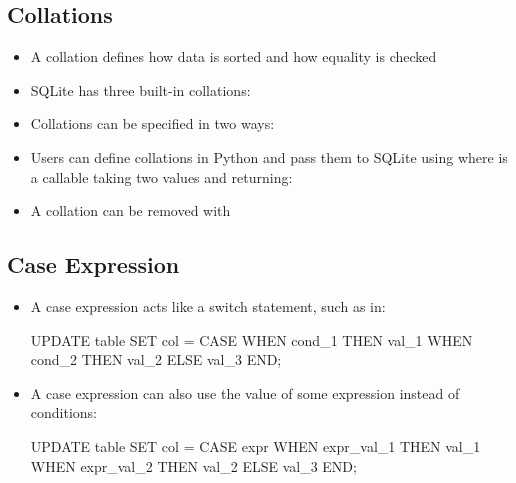 \documentclass[a4paper]{article}
\begin{document}
\subsection{Collations}
\begin{itemize}
    \item A collation defines how data is sorted and how equality is checked
    \item SQLite has three built-in collations:
    \item Collations can be specified in two ways:
    \item Users can define collations in Python and pass them to SQLite using  where  is a callable taking two values and returning:
    \item A collation can be removed with 
\end{itemize}

\subsection{Case Expression}
\begin{itemize}
    \item A case expression acts like a switch statement, such as in:
\begin{sql}
UPDATE table SET col =
CASE
  WHEN cond_1 THEN val_1
  WHEN cond_2 THEN val_2
  ELSE val_3
END;
\end{sql}
    \item A case expression can also use the value of some expression instead of conditions:
\begin{sql}
UPDATE table SET col =
CASE expr
  WHEN expr_val_1 THEN val_1
  WHEN expr_val_2 THEN val_2
  ELSE val_3
END;
\end{sql}
\end{itemize}
\end{document}
